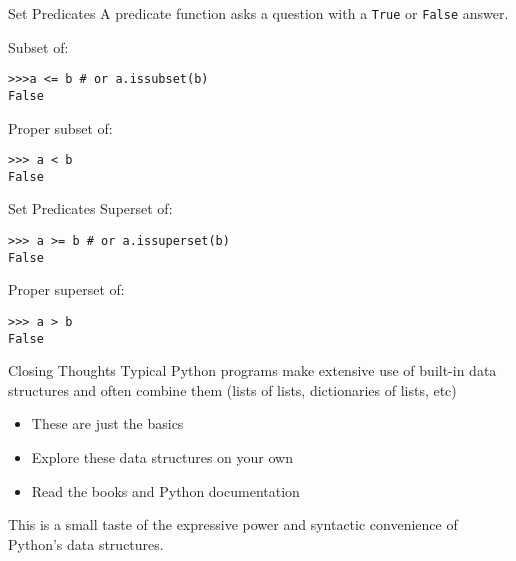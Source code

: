 \documentclass[smaller, aspectratio=1610]{beamer}
\begin{document}
\begin{frame}[label={sec:org7c424ca},fragile]{Set Predicates}
 A predicate function asks a question with a \texttt{True} or \texttt{False} answer.

Subset of:

\lstset{language=Python,label= ,caption= ,captionpos=b,numbers=none}
\begin{lstlisting}
>>>a <= b # or a.issubset(b)
False
\end{lstlisting}

Proper subset of:

\lstset{language=Python,label= ,caption= ,captionpos=b,numbers=none}
\begin{lstlisting}
>>> a < b
False
\end{lstlisting}
\end{frame}

\begin{frame}[label={sec:org5100bd4},fragile]{Set Predicates}
 Superset of:

\lstset{language=Python,label= ,caption= ,captionpos=b,numbers=none}
\begin{lstlisting}
>>> a >= b # or a.issuperset(b)
False
\end{lstlisting}

Proper superset of:

\lstset{language=Python,label= ,caption= ,captionpos=b,numbers=none}
\begin{lstlisting}
>>> a > b
False
\end{lstlisting}
\end{frame}

\begin{frame}[label={sec:orgb5b1ee2}]{Closing Thoughts}
Typical Python programs make extensive use of built-in data structures and often combine them (lists of lists, dictionaries of lists, etc)

\begin{itemize}
\item These are just the basics
\item Explore these data structures on your own
\item Read the books and Python documentation
\end{itemize}


This is a small taste of the expressive power and syntactic
convenience of Python's data structures.
\end{frame}
\end{document}
